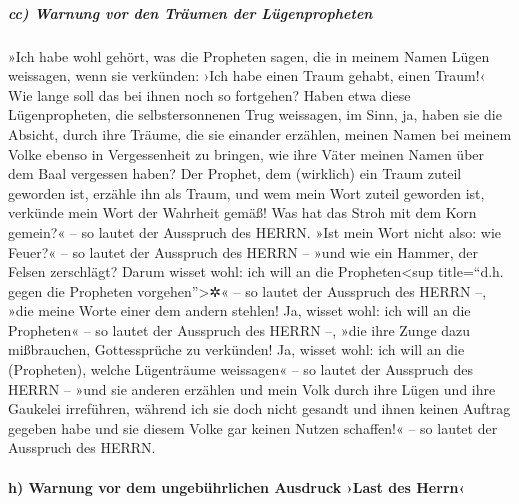 \hypertarget{cc-warnung-vor-den-truxe4umen-der-luxfcgenpropheten}{%
\subparagraph{cc) Warnung vor den Träumen der
Lügenpropheten}\label{cc-warnung-vor-den-truxe4umen-der-luxfcgenpropheten}}

»Ich habe wohl gehört, was die Propheten sagen, die in
meinem Namen Lügen weissagen, wenn sie verkünden: ›Ich habe einen Traum
gehabt, einen Traum!‹ Wie lange soll das bei ihnen noch
so fortgehen? Haben etwa diese Lügenpropheten, die selbstersonnenen Trug
weissagen, im Sinn, ja, haben sie die Absicht, durch ihre
Träume, die sie einander erzählen, meinen Namen bei meinem Volke ebenso
in Vergessenheit zu bringen, wie ihre Väter meinen Namen über dem Baal
vergessen haben? Der Prophet, dem (wirklich) ein Traum
zuteil geworden ist, erzähle ihn als Traum, und wem mein Wort zuteil
geworden ist, verkünde mein Wort der Wahrheit gemäß! Was hat das Stroh
mit dem Korn gemein?« -- so lautet der Ausspruch des HERRN.
»Ist mein Wort nicht also: wie Feuer?« -- so lautet der
Ausspruch des HERRN -- »und wie ein Hammer, der Felsen zerschlägt?
Darum wisset wohl: ich will an die Propheten\textless sup
title=``d.h. gegen die Propheten vorgehen''\textgreater✲« -- so lautet
der Ausspruch des HERRN --, »die meine Worte einer dem andern stehlen!
Ja, wisset wohl: ich will an die Propheten« -- so lautet
der Ausspruch des HERRN --, »die ihre Zunge dazu mißbrauchen,
Gottessprüche zu verkünden! Ja, wisset wohl: ich will an
die (Propheten), welche Lügenträume weissagen« -- so lautet der
Ausspruch des HERRN -- »und sie anderen erzählen und mein Volk durch
ihre Lügen und ihre Gaukelei irreführen, während ich sie doch nicht
gesandt und ihnen keinen Auftrag gegeben habe und sie diesem Volke gar
keinen Nutzen schaffen!« -- so lautet der Ausspruch des HERRN.

\hypertarget{h-warnung-vor-dem-ungebuxfchrlichen-ausdruck-last-des-herrn}{%
\paragraph{h) Warnung vor dem ungebührlichen Ausdruck ›Last des
Herrn‹}\label{h-warnung-vor-dem-ungebuxfchrlichen-ausdruck-last-des-herrn}}


